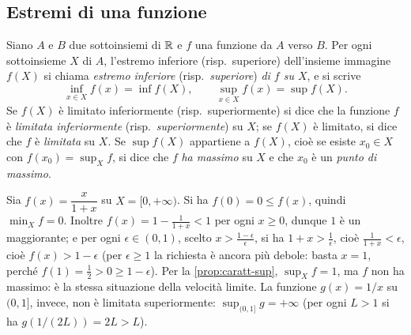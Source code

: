 \subsection{Estremi di una funzione}

\begin{definizione}
Siano $A$ e $B$ due sottoinsiemi di $\mathbb{R}$ e $f$ una funzione da $A$ verso $B$. Per ogni
sottoinsieme $X$ di $A$, l'estremo inferiore (risp.\ superiore) dell'insieme immagine
$f(X)$ si chiama \emph{estremo inferiore} (risp.\ \emph{superiore}) \emph{di $f$ su
$X$}, e si scrive
\begin{equation}\label{eq:sup-funzione}
  \inf_{x\in X}f(x)=\inf f(X), \qquad \sup_{x\in X}f(x)=\sup f(X).
\end{equation}
Se $f(X)$ è limitato inferiormente (risp.\ superiormente) si dice che la funzione $f$ è
\emph{limitata inferiormente} (risp.\ \emph{superiormente}) su $X$; se $f(X)$ è
limitato, si dice che $f$ è \emph{limitata} su $X$. Se $\sup f(X)$ appartiene a $f(X)$,
cioè se esiste $x_{0}\in X$ con $f(x_{0})=\sup_{X}f$, si dice che $f$ \emph{ha massimo}
su $X$ e che $x_{0}$ è un \emph{punto di massimo}.
\end{definizione}

\begin{esempio}\label{es:sup-funzione}
Sia $f(x)=\dfrac{x}{1+x}$ su $X=[0,+\infty)$. Si ha $f(0)=0\le f(x)$, quindi
$\min_{X}f=0$. Inoltre $f(x)=1-\frac{1}{1+x}<1$ per ogni $x\ge0$, dunque $1$ è un
maggiorante; e per ogni $\epsilon\in(0,1)$, scelto $x>\frac{1-\epsilon}{\epsilon}$, si ha
$1+x>\frac1\epsilon$, cioè $\frac{1}{1+x}<\epsilon$, cioè $f(x)>1-\epsilon$ (per
$\epsilon\ge1$ la richiesta è ancora più debole: basta $x=1$, perché
$f(1)=\frac12>0\ge1-\epsilon$). Per la
\cref{prop:caratt-sup}, $\sup_{X}f=1$, ma $f$ non ha massimo: è la stessa situazione
della velocità limite. La funzione $g(x)=1/x$ su $(0,1]$, invece, non è limitata
superiormente: $\sup_{(0,1]}g=+\infty$ (per ogni $L>1$ si ha $g(1/(2L))=2L>L$).
\end{esempio}

\begin{marginfigure}
\centering
{}
\caption{$f(x)=x/(1+x)$ su $[0,+\infty)$: il minimo vale $0$, l'estremo superiore vale
$1$ e non è un massimo.}
\end{marginfigure}

